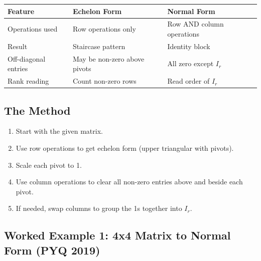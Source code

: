 \documentclass[
]{article}
\providecommand{\tightlist}{%
  \setlength{\itemsep}{0pt}\setlength{\parskip}{0pt}}
\begin{document}
\begin{longtable}[]{@{}
  >{\raggedright\arraybackslash}p{}
  >{\raggedright\arraybackslash}p{}
  >{\raggedright\arraybackslash}p{}@{}}
\toprule\noalign{}
\begin{minipage}[b]{\linewidth}\raggedright
Feature
\end{minipage} & \begin{minipage}[b]{\linewidth}\raggedright
Echelon Form
\end{minipage} & \begin{minipage}[b]{\linewidth}\raggedright
Normal Form
\end{minipage} \\
\midrule\noalign{}
\endhead
\bottomrule\noalign{}
\endlastfoot
Operations used & Row operations only & Row AND column operations \\
Result & Staircase pattern & Identity block \\
Off-diagonal entries & May be non-zero above pivots & All zero except
\(I_r\) \\
Rank reading & Count non-zero rows & Read order of \(I_r\) \\
\end{longtable}

\subsection{The Method}\label{the-method-3}

\begin{enumerate}
\def\labelenumi{\arabic{enumi}.}
\tightlist
\item
  Start with the given matrix.
\item
  Use row operations to get echelon form (upper triangular with pivots).
\item
  Scale each pivot to 1.
\item
  Use column operations to clear all non-zero entries above and beside
  each pivot.
\item
  If needed, swap columns to group the 1s together into \(I_r\).
\end{enumerate}

\subsection{Worked Example 1: 4x4 Matrix to Normal Form (PYQ
2019)}\label{worked-example-1-4x4-matrix-to-normal-form-pyq-2019}
\end{document}
